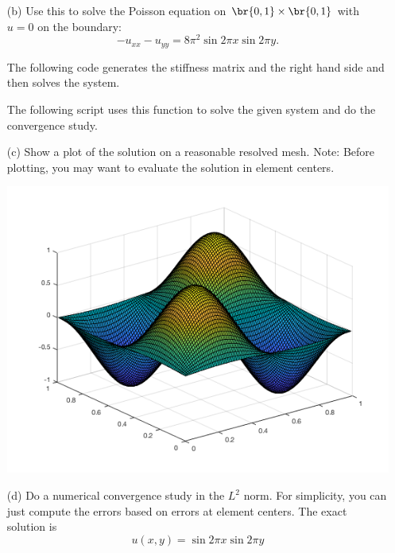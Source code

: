 \documentclass[11pt, titlepage]{article}
\begin{document}
\begin{enumerate}
\begin{enumerate}
      \item[(b)] %
        Use this to solve the Poisson equation on $\br{0, 1} \times \br{0, 1}$
        with $u = 0$ on the boundary:
        \[
          -u_{xx} - u_{yy} = 8\pi^2 \sin{2\pi x} \sin{2\pi y}.
        \]

        The following code generates the stiffness matrix and the right hand
        side and then solves the system.
        
        The following script uses this function to solve the given system and
        do the convergence study.
        

      \item[(c)] %
        Show a plot of the solution on a reasonable resolved mesh.
        Note: Before plotting, you may want to evaluate the solution in element
        centers.

        \begin{center}
          \includegraphics[scale=.5]{Figures/03_01}
        \end{center}

      \item[(d)] %
        Do a numerical convergence study in the $L^2$ norm.
        For simplicity, you can just compute the errors based on errors at
        element centers.
        The exact solution is
        \[
          u(x, y) = \sin{2 \pi x} \sin{2 \pi y}
        \]


\end{enumerate}
\end{enumerate}
\end{document}
